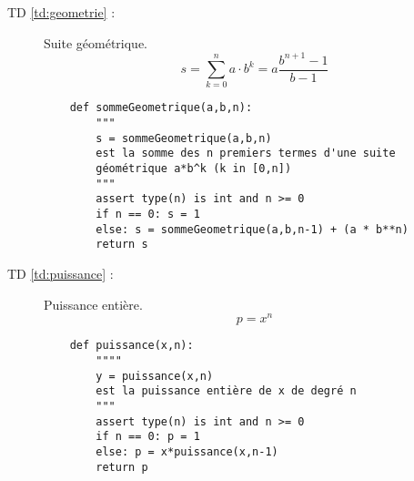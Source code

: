 \begin{minipage}[t]{10cm}
\begin{description}
\item[TD \ref{td:geometrie} :] Suite géométrique.
	$$s = \sum_{k=0}^{n} a\cdot b^k = a\frac{b^{n+1}-1}{b-1}$$
	\begin{py}{14cm}
	\begin{verbatim}
	def sommeGeometrique(a,b,n):
	    """
	    s = sommeGeometrique(a,b,n)
	    est la somme des n premiers termes d'une suite
	    géométrique a*b^k (k in [0,n])
	    """
	    assert type(n) is int and n >= 0
	    if n == 0: s = 1
	    else: s = sommeGeometrique(a,b,n-1) + (a * b**n)
	    return s
	\end{verbatim}
	\end{py}
\end{description}
\end{minipage}
\hfill
\begin{minipage}[t]{10cm}
\begin{description}
\item[TD \ref{td:puissance} :] Puissance entière.
	$$p = x^n$$
	\begin{py}{14cm}
	\begin{verbatim}
	def puissance(x,n):
	    """"
	    y = puissance(x,n)
	    est la puissance entière de x de degré n
	    """
	    assert type(n) is int and n >= 0
	    if n == 0: p = 1
	    else: p = x*puissance(x,n-1)
	    return p
	\end{verbatim}
	\end{py}
\end{description}
\end{minipage}

